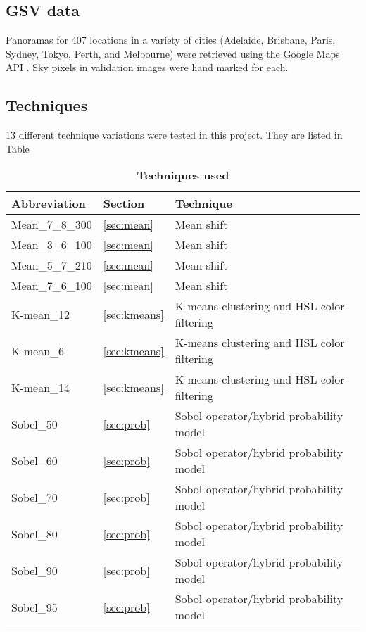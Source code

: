 \documentclass[final,3p,times,authoryear]{elsarticle}
\begin{document}
\subsection{GSV data}\label{sec:gsvdata}
Panoramas for 407 locations in a variety of cities (Adelaide, Brisbane, Paris, Sydney, Tokyo, Perth, and Melbourne) were retrieved using the Google Maps API \citep{GoogleMaps2017b}. Sky pixels in validation images were hand marked for each.

\subsection{Techniques}
13 different technique variations were tested in this project. They are listed in Table 

\begin{table}[!htbp]
\caption{\bf Techniques used  \label{tab:techniques}}     
\begin{tabular}{ l  l l}
\textbf{Abbreviation} & \textbf{Section} & \textbf{Technique}  \\ \hline
Mean\_7\_8\_300 & \ref{sec:mean} & Mean shift \\
Mean\_3\_6\_100	 & \ref{sec:mean} & Mean shift \\
Mean\_5\_7\_210	 & \ref{sec:mean} & Mean shift \\	 
Mean\_7\_6\_100	 & \ref{sec:mean} & Mean shift \\
K-mean\_12 & \ref{sec:kmeans} & K-means clustering and HSL color filtering \\
K-mean\_6 & \ref{sec:kmeans} &  K-means clustering and HSL color filtering \\
K-mean\_14 & \ref{sec:kmeans} & K-means clustering and HSL color filtering \\
Sobel\_50 & \ref{sec:prob} & Sobol operator/hybrid probability model \\	  
Sobel\_60 & \ref{sec:prob} & Sobol operator/hybrid probability model \\	
Sobel\_70 & \ref{sec:prob} & Sobol operator/hybrid probability model \\	
Sobel\_80 & \ref{sec:prob} & Sobol operator/hybrid probability model\\
Sobel\_90 & \ref{sec:prob} & Sobol operator/hybrid probability model \\
Sobel\_95 & \ref{sec:prob} & Sobol operator/hybrid probability model \\
\hline
\end{tabular}
\end{table}
\end{document}
